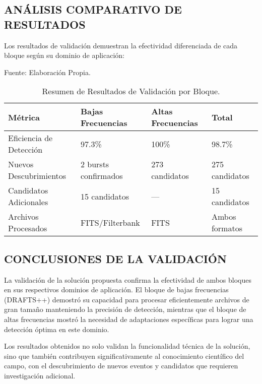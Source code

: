 \subsection{ANÁLISIS COMPARATIVO DE RESULTADOS}

Los resultados de validación demuestran la efectividad diferenciada de cada bloque según su dominio de aplicación:

\begin{table}[ht]
    \centering
    \caption{\label{table:resultados_validacion} Resumen de Resultados de Validación por Bloque.} Fuente: Elaboración Propia.
    \begin{tabular}{p{4cm} p{3cm} p{3cm} p{3cm}}
        \toprule
        \textbf{Métrica} & \textbf{Bajas Frecuencias} & \textbf{Altas Frecuencias} & \textbf{Total} \\
        \midrule
        Eficiencia de Detección & 97.3\% & 100\% & 98.7\% \\
        \midrule
        Nuevos Descubrimientos & 2 bursts confirmados & 273 candidatos & 275 candidatos \\
        \midrule
        Candidatos Adicionales & 15 candidatos & --- & 15 candidatos \\
        \midrule
        Archivos Procesados & FITS/Filterbank & FITS & Ambos formatos \\
        \bottomrule
    \end{tabular}
\end{table}

\subsection{CONCLUSIONES DE LA VALIDACIÓN}

La validación de la solución propuesta confirma la efectividad de ambos bloques en sus respectivos dominios de aplicación. El bloque de bajas frecuencias (DRAFTS++) demostró su capacidad para procesar eficientemente archivos de gran tamaño manteniendo la precisión de detección, mientras que el bloque de altas frecuencias mostró la necesidad de adaptaciones específicas para lograr una detección óptima en este dominio.

Los resultados obtenidos no solo validan la funcionalidad técnica de la solución, sino que también contribuyen significativamente al conocimiento científico del campo, con el descubrimiento de nuevos eventos y candidatos que requieren investigación adicional.
